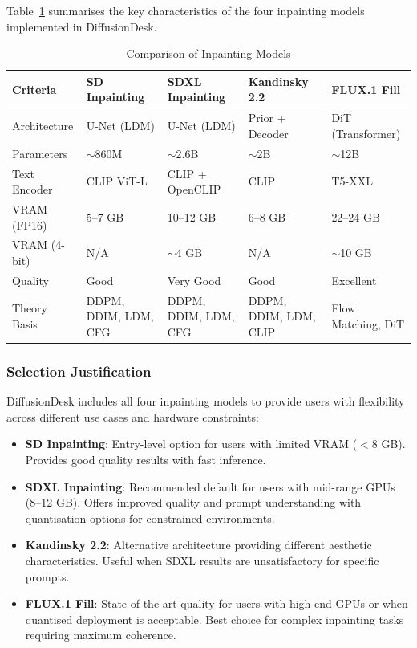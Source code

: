 \documentclass[12pt,a4paper]{report}
\begin{document}
Table~\ref{tab:inpainting_comparison} summarises the key characteristics of the four inpainting models implemented in DiffusionDesk.

\begin{table}[H]
\centering
\caption{Comparison of Inpainting Models}
\label{tab:inpainting_comparison}
\small
\renewcommand{\arraystretch}{1.3}
\begin{tabular}{|p{2.2cm}|p{2.5cm}|p{2.8cm}|p{2.5cm}|p{2.8cm}|}
\hline
\textbf{Criteria} & \textbf{SD Inpainting} & \textbf{SDXL Inpainting} & \textbf{Kandinsky 2.2} & \textbf{FLUX.1 Fill} \\
\hline
Architecture & U-Net (LDM) & U-Net (LDM) & Prior + Decoder & DiT (Transformer) \\
\hline
Parameters & $\sim$860M & $\sim$2.6B & $\sim$2B & $\sim$12B \\
\hline
Text Encoder & CLIP ViT-L & CLIP + OpenCLIP & CLIP & T5-XXL \\
\hline
VRAM (FP16) & 5--7 GB & 10--12 GB & 6--8 GB & 22--24 GB \\
\hline
VRAM (4-bit) & N/A & $\sim$4 GB & N/A & $\sim$10 GB \\
\hline
Quality & Good & Very Good & Good & Excellent \\
\hline
Theory Basis & DDPM, DDIM, LDM, CFG & DDPM, DDIM, LDM, CFG & DDPM, DDIM, LDM, CLIP & Flow Matching, DiT \\
\hline
\end{tabular}
\end{table}

\subsubsection{Selection Justification}

DiffusionDesk includes all four inpainting models to provide users with flexibility across different use cases and hardware constraints:

\begin{itemize}
    \item \textbf{SD Inpainting}: Entry-level option for users with limited VRAM ($<$8 GB). Provides good quality results with fast inference.
    \item \textbf{SDXL Inpainting}: Recommended default for users with mid-range GPUs (8--12 GB). Offers improved quality and prompt understanding with quantisation options for constrained environments.
    \item \textbf{Kandinsky 2.2}: Alternative architecture providing different aesthetic characteristics. Useful when SDXL results are unsatisfactory for specific prompts.
    \item \textbf{FLUX.1 Fill}: State-of-the-art quality for users with high-end GPUs or when quantised deployment is acceptable. Best choice for complex inpainting tasks requiring maximum coherence.
\end{itemize}
\end{document}
